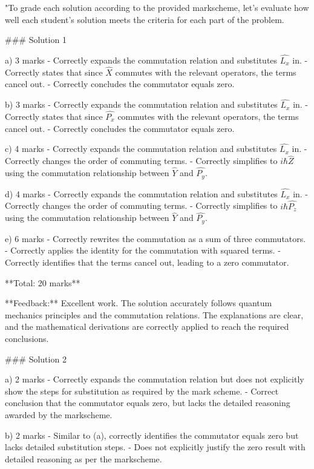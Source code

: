 \documentclass[a4paper,11pt]{article}
\begin{document}
"To grade each solution according to the provided markscheme, let's evaluate how well each student's solution meets the criteria for each part of the problem.

### Solution 1

a) 3 marks
- Correctly expands the commutation relation and substitutes \(\hat{L_{x}}\) in.
- Correctly states that since \(\hat{X}\) commutes with the relevant operators, the terms cancel out.
- Correctly concludes the commutator equals zero.

b) 3 marks
- Correctly expands the commutation relation and substitutes \(\hat{L_{x}}\) in.
- Correctly states that since \(\hat{P_{x}}\) commutes with the relevant operators, the terms cancel out.
- Correctly concludes the commutator equals zero.

c) 4 marks
- Correctly expands the commutation relation and substitutes \(\hat{L_{x}}\) in.
- Correctly changes the order of commuting terms.
- Correctly simplifies to \(i\hbar\hat{Z}\) using the commutation relationship between \(\hat{Y}\) and \(\hat{P_{y}}\).

d) 4 marks
- Correctly expands the commutation relation and substitutes \(\hat{L_{x}}\) in.
- Correctly changes the order of commuting terms.
- Correctly simplifies to \(i\hbar\hat{P_{z}}\) using the commutation relationship between \(\hat{Y}\) and \(\hat{P_{y}}\).

e) 6 marks
- Correctly rewrites the commutation as a sum of three commutators.
- Correctly applies the identity for the commutation with squared terms.
- Correctly identifies that the terms cancel out, leading to a zero commutator.

**Total: 20 marks**

**Feedback:** Excellent work. The solution accurately follows quantum mechanics principles and the commutation relations. The explanations are clear, and the mathematical derivations are correctly applied to reach the required conclusions.

### Solution 2

a) 2 marks
- Correctly expands the commutation relation but does not explicitly show the steps for substitution as required by the mark scheme.
- Correct conclusion that the commutator equals zero, but lacks the detailed reasoning awarded by the markscheme.

b) 2 marks
- Similar to (a), correctly identifies the commutator equals zero but lacks detailed substitution steps.
- Does not explicitly justify the zero result with detailed reasoning as per the markscheme.
\end{document}
